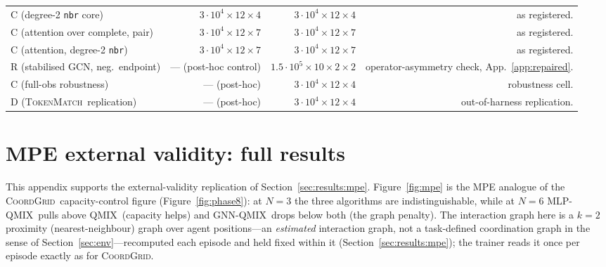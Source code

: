 \documentclass[10pt]{article}
\newcommand{\algoname}[1]{\textsc{#1}}
\newcommand{\qmix}{\algoname{QMIX}}
\newcommand{\gnnqmix}{\algoname{GNN-QMIX}}
\newcommand{\coordgrid}{\textsc{CoordGrid}}
\newcommand{\mlpqmix}{\algoname{MLP-QMIX}}
\newcommand{\tokenmatch}{\textsc{TokenMatch}}
\begin{document}
\begin{table}[!ht]
{\begin{tabular}{lrrr}
    C (degree-2 \texttt{nbr} core) & $3\cdot 10^4 \times 12 \times 4$ & $3\cdot 10^4 \times 12 \times 4$ & as registered. \\
    C (attention over complete, pair) & $3\cdot 10^4 \times 12 \times 7$ & $3\cdot 10^4 \times 12 \times 7$ & as registered. \\
    C (attention, degree-2 \texttt{nbr}) & $3\cdot 10^4 \times 12 \times 7$ & $3\cdot 10^4 \times 12 \times 7$ & as registered. \\
    R (stabilised GCN, neg.\ endpoint) & --- (post-hoc control) & $1.5\cdot 10^5 \times 10 \times 2 \times 2$ & operator-asymmetry check, App.~\ref{app:repaired}. \\
    C (full-obs robustness) & --- (post-hoc) & $3\cdot 10^4 \times 12 \times 4$ & robustness cell. \\
    D (\tokenmatch\ replication) & --- (post-hoc) & $3\cdot 10^4 \times 12 \times 4$ & out-of-harness replication. \\
    \bottomrule
  \end{tabular}}%
\end{table}

\section{MPE external validity: full results}
\label{app:mpe}

This appendix supports the external-validity replication of
Section~\ref{sec:results:mpe}. Figure~\ref{fig:mpe} is the MPE analogue of
the \coordgrid\ capacity-control figure (Figure~\ref{fig:phase8}): at
$N{=}3$ the three algorithms are indistinguishable, while at $N{=}6$
\mlpqmix\ pulls above \qmix\ (capacity helps) and \gnnqmix\ drops below
both (the graph penalty). The interaction graph here is a $k{=}2$
proximity (nearest-neighbour) graph over agent positions---an
\emph{estimated} interaction graph, not a task-defined coordination graph in
the sense of Section~\ref{sec:env}---recomputed each episode and
held fixed within it (Section~\ref{sec:results:mpe}); the trainer reads it
once per episode exactly as for \coordgrid.
\end{document}
